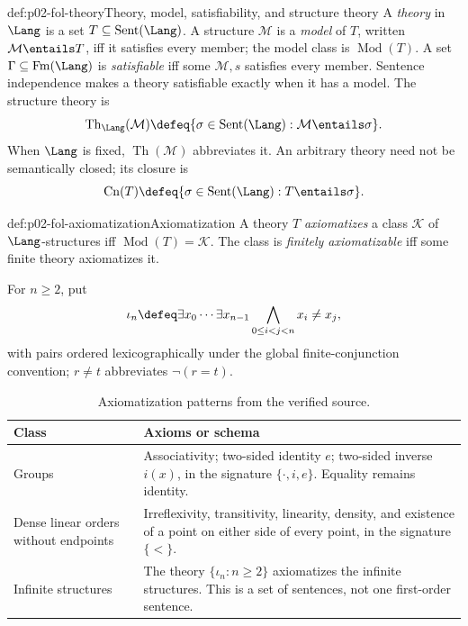 \begin{hbdefinition}{def:p02-fol-theory}{Theory, model, satisfiability, and structure theory}
A \emph{theory} in \(\Lang\) is a set
\(T\subseteq\operatorname{Sent}(\Lang)\).  A structure \(\mathcal M\) is a
\emph{model} of \(T\), written \(\mathcal M\entails T\), iff it satisfies
every member; the model class is \(\operatorname{Mod}(T)\).  A set
\(\Gamma\subseteq\operatorname{Fm}(\Lang)\) is \emph{satisfiable} iff some
\(\mathcal M,s\) satisfies every member.  Sentence independence makes a
theory satisfiable exactly when it has a model.  The structure theory is
\[
 \operatorname{Th}_{\Lang}(\mathcal M)
 \defeq\{\sigma\in\operatorname{Sent}(\Lang):
             \mathcal M\entails\sigma\}.
\]
When \(\Lang\) is fixed, \(\operatorname{Th}(\mathcal M)\) abbreviates it.
An arbitrary theory need not be semantically closed; its closure is
\[
 \operatorname{Cn}(T)\defeq
 \{\sigma\in\operatorname{Sent}(\Lang):T\entails\sigma\}.
\]
\end{hbdefinition}

\begin{hbdefinition}{def:p02-fol-axiomatization}{Axiomatization}
A theory \(T\) \emph{axiomatizes} a class \(\mathcal K\) of
\(\Lang\)-structures iff \(\operatorname{Mod}(T)=\mathcal K\).  The class
is \emph{finitely axiomatizable} iff some finite theory axiomatizes it.
\end{hbdefinition}

For \(n\ge2\), put
\[
 \iota_n\defeq\exists x_0\cdots\exists x_{n-1}
 \bigwedge_{0\le i<j<n}x_i\ne x_j,
\]
with pairs ordered lexicographically under the global finite-conjunction
convention; \(r\ne t\) abbreviates \(\neg(r=t)\).

\begin{table}[tp]
\centering
\caption{Axiomatization patterns from the verified source.}
\label{tab:p02-fol-axiomatizations}
\begin{tabular}{p{}p{}}
\toprule
Class & Axioms or schema \\
\midrule
Groups & Associativity; two-sided identity \(e\); two-sided inverse
\(i(x)\), in the signature \(\{\cdot,i,e\}\). Equality remains identity.\\
Dense linear orders without endpoints & Irreflexivity, transitivity,
linearity, density, and existence of a point on either side of every point,
in the signature \(\{<\}\).\\
Infinite structures & The theory \(\{\iota_n:n\ge2\}\) axiomatizes the
infinite structures.  This is a set of sentences, not one first-order
sentence.\\
\bottomrule
\end{tabular}
\end{table}

